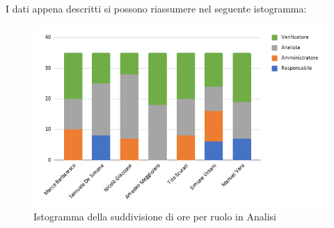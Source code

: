         \pagebreak
    I dati appena descritti si possono riassumere nel seguente istogramma:
        \begin{figure}[!h]
            \vspace{5px}
            \includegraphics[scale=0.6]{../../../Images/Diagrammi/Istogrammi/ore analisi.png}
            \centering
            \caption{Istogramma della suddivisione di ore per ruolo in Analisi}
        \end{figure}

